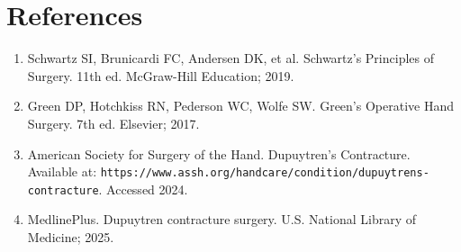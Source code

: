 \section*{References}
\begin{enumerate}
  \item Schwartz SI, Brunicardi FC, Andersen DK, et al. Schwartz's Principles of Surgery. 11th ed. McGraw-Hill Education; 2019.
  \item Green DP, Hotchkiss RN, Pederson WC, Wolfe SW. Green's Operative Hand Surgery. 7th ed. Elsevier; 2017.
  \item American Society for Surgery of the Hand. Dupuytren's Contracture. Available at: \texttt{https://www.assh.org/handcare/condition/dupuytrens-contracture}. Accessed 2024.
  \item MedlinePlus. Dupuytren contracture surgery. U.S. National Library of Medicine; 2025.
\end{enumerate}

\clearpage
